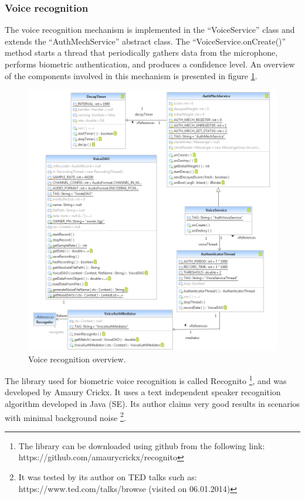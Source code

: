\subsubsection{Voice recognition}
The voice recognition mechanism is implemented in the ``VoiceService'' class and extends the ``AuthMechService'' abstract class. The ``VoiceService.onCreate()'' method starts a thread that periodically gathers data from the microphone, performs biometric authentication, and produces a confidence level. An overview of the components involved in this mechanism is presented in figure \ref{fig:voice}.
\begin{figure}[h]
    \centering
    \includegraphics[width=\textwidth]{Pictures/voice}
    \caption{Voice recognition overview.}
    \label{fig:voice}
\end{figure}

The library used for biometric voice recognition is called Recognito \footnote{The library can be downloaded using github from the following link: https://github.com/amaurycrickx/recognito}, and was developed by Amaury Crickx. It uses a text independent speaker recognition algorithm developed in Java (SE). Its author claims very good results in scenarios with minimal background noise \footnote{It was tested by its author on TED talks such as:  https://www.ted.com/talks/browse (visited on 06.01.2014)}.

